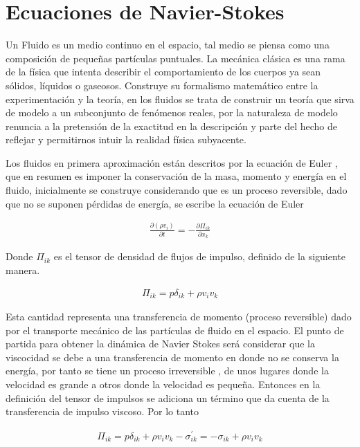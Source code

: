 \section{Ecuaciones de Navier-Stokes}

\noindent Un Fluido es un medio continuo en el espacio, tal medio se piensa como una composición de pequeñas partículas puntuales. La mecánica clásica es una rama de la física que intenta describir el comportamiento de los cuerpos ya sean sólidos, líquidos o gaseosos. Construye su formalismo matemático entre la experimentación y la teoría, en los fluidos se trata de construir un teoría que sirva de modelo a un subconjunto de fenómenos reales, por la naturaleza de modelo renuncia a la pretensión de la exactitud en la descripción y parte del hecho de reflejar y permitirnos intuir la realidad física subyacente. 
\medskip

\noindent Los fluidos en primera aproximación están descritos por la ecuación de Euler , que en resumen es imponer la conservación de la masa, momento y energía en el fluido\cite{Landau}, inicialmente se construye considerando que es un proceso reversible, dado que no se suponen pérdidas de energía\cite{George}, se escribe la ecuación de Euler 

\begin{eqnarray}
\frac{\partial (\rho v_{i})}{\partial t} = -\frac{\partial \Pi_{ik}}{\partial x_{k}}
\end{eqnarray}

\noindent Donde $\Pi_{ik}$ es el tensor de densidad de flujos de impulso, definido de la siguiente manera.

\begin{eqnarray}
\Pi_{ik} = p\delta_{ik} + \rho v_{i}v_{k}
\end{eqnarray}


\noindent Esta cantidad representa una transferencia de momento (proceso  reversible) dado por el transporte mecánico de las partículas de fluido en el espacio. El punto de partida para obtener la dinámica de Navier Stokes será considerar que la viscocidad se debe a una transferencia de momento en donde no se conserva la energía, por tanto se tiene un proceso irreversible , de unos lugares donde la velocidad es grande a otros donde la velocidad es pequeña. Entonces en la definición del tensor de impulsos se adiciona un término que da cuenta de la transferencia de impulso viscoso. Por lo tanto

\begin{eqnarray}
\Pi_{ik} = p\delta_{ik} + \rho v_{i}v_{k} - \sigma^{'}_{ik}=-\sigma_{ik}+\rho v_{i}v_{k}
\end{eqnarray}

